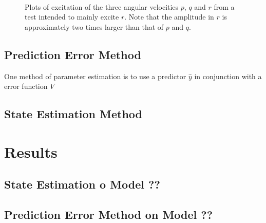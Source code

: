 \begin{figure}[tbp]
  \centering
  \qquad
  \\
  \caption{\label{fig:rTest}%
 Plots of excitation of the three angular velocities $p$, $q$ and $r$ from a test intended to mainly excite $r$. Note that the amplitude in $r$ is approximately two times larger than that of $p$ and $q$.}
\end{figure}


\subsection{Prediction Error Method}
One method of parameter estimation is to use a predictor $\hat{y}$ in conjunction with a error function $V$


\subsection{State Estimation Method}

\section{Results}
\subsection{State Estimation o Model ??}
\subsection{Prediction Error Method on Model ??}


